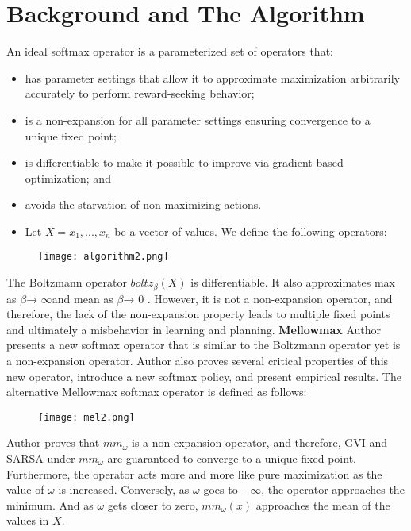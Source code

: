 \section{Background and The Algorithm}
\label{section:algorithm}
An ideal softmax operator is a parameterized set of operators that:
\begin{itemize}
\item has parameter settings that allow it to approximate maximization arbitrarily accurately to perform reward-seeking behavior;
\item is a non-expansion for all parameter settings ensuring convergence to a unique fixed point;
\item is differentiable to make it possible to improve via gradient-based optimization; and
\item avoids the starvation of non-maximizing actions.
\item Let $X = x_{1},...,x_{n}$ be a vector of values. We define the following operators:
\end{itemize}


\begin{figure}[htbp]
\centering
\texttt{[image: algorithm2.png]}
\end{figure}
The Boltzmann operator $boltz_{\beta}(X)$ is differentiable. It also approximates max as $\beta $→ $\infty$and mean as $\beta $→ $0$ . However, it is not a non-expansion operator, and therefore, the lack of the non-expansion property leads to multiple fixed points and ultimately a misbehavior in learning and planning.
\newpage
\textbf{Mellowmax}
\newline\newline
Author presents a new softmax operator that is similar to the Boltzmann operator yet is a non-expansion operator. Author also proves several critical properties of this new operator, introduce a new softmax policy, and present empirical results. The alternative Mellowmax softmax operator is defined as follows:

\begin{figure}[htbp]
\centering
\texttt{[image: mel2.png]}
\end{figure}

Author proves that $mm_\omega$ is a non-expansion operator, and therefore, GVI and SARSA under $mm_\omega$ are guaranteed to converge to a unique fixed point.
Furthermore, the operator acts more and more like pure maximization as the value of $\omega$ is increased. Conversely, as $\omega$ goes to $-\infty$, the operator approaches the minimum.
And as ${\omega}$ gets closer to zero, $mm_{\omega}(x)$ approaches the
mean of the values in $X$.


